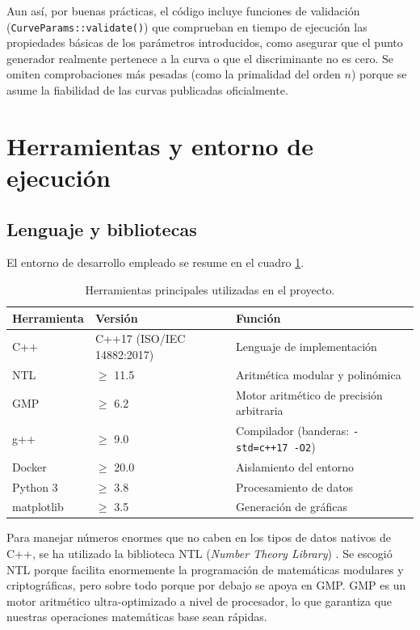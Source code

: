 Aun así, por buenas prácticas, el código incluye funciones de validación (\texttt{CurveParams::validate()}) que comprueban en tiempo de ejecución las propiedades básicas de los parámetros 
introducidos, como asegurar que el punto generador realmente pertenece a la curva o que el discriminante no es cero. Se omiten comprobaciones más pesadas (como la primalidad del orden $n$) 
porque se asume la fiabilidad de las curvas publicadas oficialmente.


\section{Herramientas y entorno de ejecución}
\label{sec:impl-entorno}

\subsection{Lenguaje y bibliotecas}
\label{subsec:impl-lenguaje}

El entorno de desarrollo empleado se resume en el cuadro \ref{tab:herramientas}.

\begin{table}[htbp]
\centering
\begin{tabular}{lll}
\hline
\textbf{Herramienta} & \textbf{Versión} & \textbf{Función} \\
\hline
C++ & C++17 (ISO/IEC 14882:2017) & Lenguaje de implementación \\
NTL & $\geq$ 11.5 & Aritmética modular y polinómica \\
GMP & $\geq$ 6.2 & Motor aritmético de precisión arbitraria \\
g++ & $\geq$ 9.0 & Compilador (banderas: \texttt{-std=c++17 -O2}) \\
Docker & $\geq$ 20.0 & Aislamiento del entorno \\
Python 3 & $\geq$ 3.8 & Procesamiento de datos \\
matplotlib & $\geq$ 3.5 & Generación de gráficas \\
\hline
\end{tabular}
\caption{Herramientas principales utilizadas en el proyecto.}
\label{tab:herramientas}
\end{table}

Para manejar números enormes que no caben en los tipos de datos nativos de C++, se ha utilizado la biblioteca NTL (\textit{Number Theory Library}) \cite{shoup-ntl}. Se escogió NTL porque 
facilita enormemente la programación de matemáticas modulares y criptográficas, pero sobre todo porque por debajo se apoya en GMP. GMP es un motor aritmético ultra-optimizado a nivel de 
procesador, lo que garantiza que nuestras operaciones matemáticas base sean rápidas.

